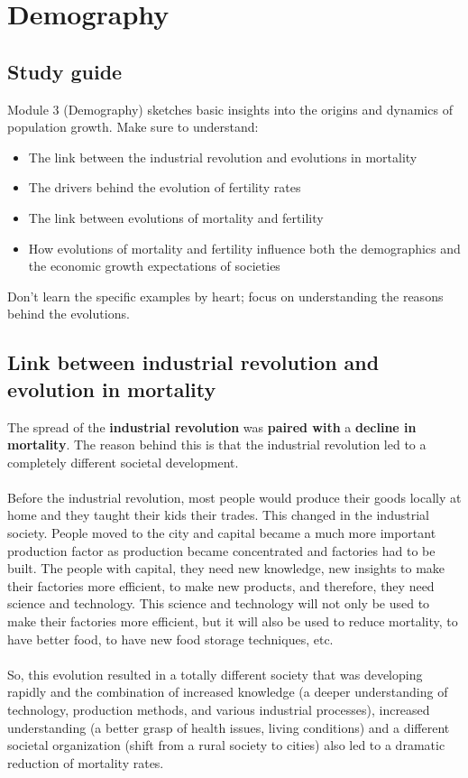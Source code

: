 \documentclass[../summary.tex]{subfiles}
\begin{document}
	
	\section{Demography}
	
	\subsection{Study guide}
	
	Module 3 (Demography) sketches basic insights into the origins and dynamics of population growth. Make sure to understand:
	\begin{itemize}
		\item The link between the industrial revolution and evolutions in mortality
		\item The drivers behind the evolution of fertility rates
		\item The link between evolutions of mortality and fertility
		\item How evolutions of mortality and fertility influence both the demographics and the economic
		growth expectations of societies
	\end{itemize}
	Don’t learn the specific examples by heart; focus on understanding the reasons behind the evolutions.
	
	\subsection{Link between industrial revolution and evolution in mortality}
	The spread of the \textbf{industrial revolution} was \textbf{paired with} a \textbf{decline in mortality}. The reason behind this is that the industrial revolution led to a completely different societal development. 
	\\
	\\
	Before the industrial revolution, most people would produce their goods locally at home and they taught their kids their trades. This changed in the industrial society. People moved to the city and capital became a much more important production factor as production became concentrated and factories had to be built. The people with capital, they need new knowledge, new insights to make their factories more efficient, to make new products, and therefore, they need science and technology. This science and technology will not only be used to make their factories more efficient, but it will also be used to reduce mortality, to have better food, to have new food storage techniques, etc. 
	\\
	\\
	So, this evolution resulted in a totally different society that was developing rapidly and the combination of increased knowledge (a deeper understanding of technology, production methods, and various industrial processes), increased understanding (a better grasp of health issues, living conditions) and a different societal organization (shift from a rural society to cities) also led to a dramatic reduction of mortality rates. 
	
\end{document}
